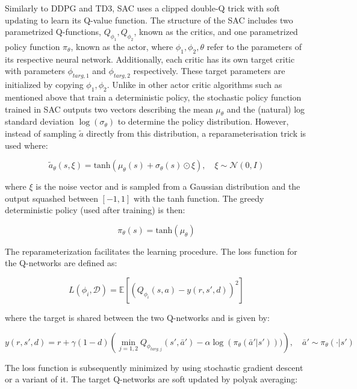Similarly to DDPG and TD3, SAC uses a clipped double-Q trick with soft updating to learn its Q-value function. The structure of the SAC includes two parametrized Q-functions, $Q_{\phi_1},Q_{\phi_2}$, known as the critics, and one parametrized policy function $\pi_\theta$, known as the actor, where $\phi_1,\phi_2,\theta$ refer to the parameters of its respective neural network. Additionally, each critic has its own target critic with parameters $\phi_{targ,1}$ and $\phi_{targ,2}$ respectively. These target parameters are initialized by copying  $\phi_1,\phi_2$. Unlike in other actor critic algorithms such as mentioned above that train a deterministic policy, the stochastic policy function trained in SAC outputs two vectors describing the mean $\mu_{\theta}$ and the (natural) log standard deviation $\log(\sigma_\theta)$ to determine the policy distribution. However, instead of sampling $\tilde{a}$ directly from this distribution, a reparameterisation trick is used where:

\begin{equation}
	\tilde{a}_{\theta} (s, \xi) = \text{tanh} (\mu_{\theta}(s) + \sigma_{\theta}(s) \odot \xi), \quad \xi \sim \mathcal{N}(0,I)
\end{equation}

where $\xi$ is the noise vector and is sampled from a Gaussian distribution and the output squashed between $[-1,1]$ with the tanh function. The greedy deterministic policy (used after training) is then:

\begin{equation}
\pi_{\theta}(s) = \text{tanh}(\mu_{\theta})
\end{equation}

The reparameterization facilitates the learning procedure. The loss function for the Q-networks are defined as:

\begin{equation}
	L(\phi_i,\mathcal{D}) = \mathbb{E} \left[ \left(Q_{\phi_i}(s,a) - y(r,s',d) \right)^2 \right]
\end{equation}

where the target is shared between the two Q-networks and is given by:

\begin{equation}
	y(r,s',d) = r + \gamma (1-d) \left(\min_{j = 1,2} Q_{\phi_{targ,j}}(s', \bar{a}') - \alpha \log (\pi_{\theta} (\bar{a}'|s')))\right), \quad \bar{a}' \sim \pi_{\theta}(\cdot | s')
\end{equation}

The loss function is subsequently minimized by using stochastic gradient descent or a variant of it. The target Q-networks are soft updated by polyak averaging:

